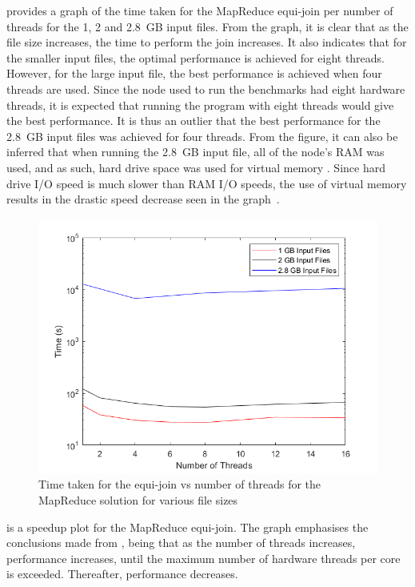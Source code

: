\documentclass[12pt,twocolumn]{witseiepaper}
\begin{document}
 provides a graph of the time taken for the MapReduce equi-join per number of threads for the 1, 2 and 2.8~GB input files. From the graph, it is clear that as the file size increases, the time to perform the join increases. It also indicates that for the smaller input files, the optimal performance is achieved for eight threads. However, for the large input file, the best performance is achieved when four threads are used. Since the node used to run the benchmarks had eight hardware threads, it is expected that running the program with eight threads would give the best performance. It is thus an outlier that the best performance for the 2.8~GB input files was achieved for four threads. From the figure, it can also be inferred that when running the 2.8~GB input file, all of the node's RAM was used, and as such, hard drive space was used for virtual memory \cite{ram}. Since hard drive I/O speed is much slower than RAM I/O speeds, the use of virtual memory results in the drastic speed decrease seen in the graph~\cite{ram}.

\begin{figure}[h]
	\centering
	\includegraphics[width=1\columnwidth]{mapReduceTimevsThreads.png}
	\caption{Time taken for the equi-join vs number of threads for the MapReduce solution for various file sizes}
	\raggedright
	\label{fig:resultsMR}	
\end{figure}

 is a speedup plot for the MapReduce equi-join. The graph emphasises the conclusions made from , being that as the number of threads increases, performance increases, until the maximum number of hardware threads per core is exceeded. Thereafter, performance decreases.
\end{document}
